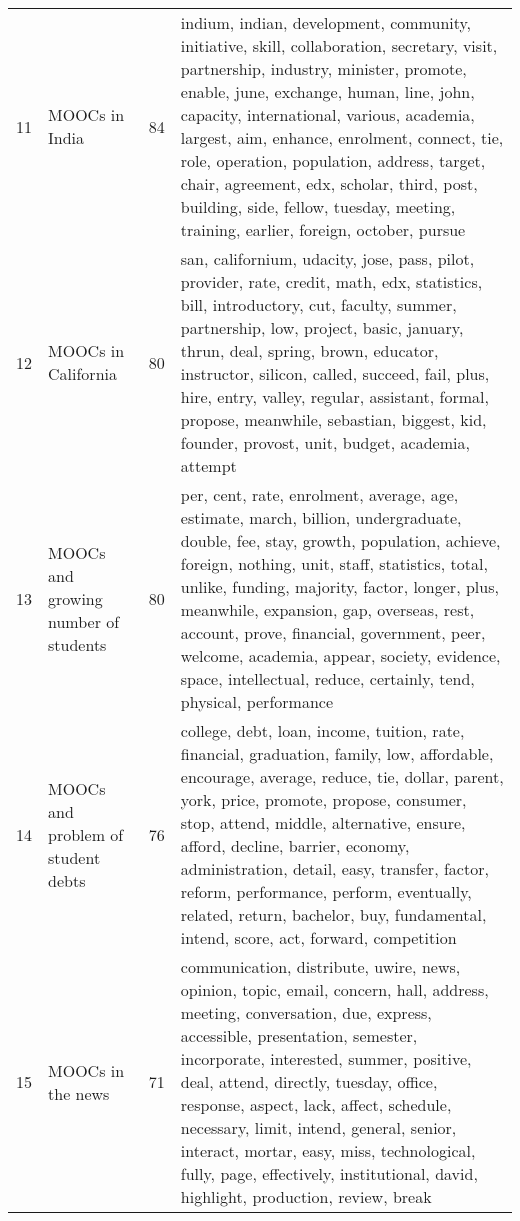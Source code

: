 \begin{table}[ht]
{\begin{tabularx}{\textwidth}{llrX}
   11 & MOOCs in India & 84 & indium, indian, development, community, initiative, skill, collaboration, secretary, visit, partnership, industry, minister, promote, enable, june, exchange, human, line, john, capacity, international, various, academia, largest, aim, enhance, enrolment, connect, tie, role, operation, population, address, target, chair, agreement, edx, scholar, third, post, building, side, fellow, tuesday, meeting, training, earlier, foreign, october, pursue \\ 
   12 & MOOCs in California & 80 & san, californium, udacity, jose, pass, pilot, provider, rate, credit, math, edx, statistics, bill, introductory, cut, faculty, summer, partnership, low, project, basic, january, thrun, deal, spring, brown, educator, instructor, silicon, called, succeed, fail, plus, hire, entry, valley, regular, assistant, formal, propose, meanwhile, sebastian, biggest, kid, founder, provost, unit, budget, academia, attempt \\ 
   13 & MOOCs and growing number of students & 80 & per, cent, rate, enrolment, average, age, estimate, march, billion, undergraduate, double, fee, stay, growth, population, achieve, foreign, nothing, unit, staff, statistics, total, unlike, funding, majority, factor, longer, plus, meanwhile, expansion, gap, overseas, rest, account, prove, financial, government, peer, welcome, academia, appear, society, evidence, space, intellectual, reduce, certainly, tend, physical, performance \\ 
   14 & MOOCs and problem of student debts & 76 & college, debt, loan, income, tuition, rate, financial, graduation, family, low, affordable, encourage, average, reduce, tie, dollar, parent, york, price, promote, propose, consumer, stop, attend, middle, alternative, ensure, afford, decline, barrier, economy, administration, detail, easy, transfer, factor, reform, performance, perform, eventually, related, return, bachelor, buy, fundamental, intend, score, act, forward, competition \\ 
   15 & MOOCs in the news & 71 & communication, distribute, uwire, news, opinion, topic, email, concern, hall, address, meeting, conversation, due, express, accessible, presentation, semester, incorporate, interested, summer, positive, deal, attend, directly, tuesday, office, response, aspect, lack, affect, schedule, necessary, limit, intend, general, senior, interact, mortar, easy, miss, technological, fully, page, effectively, institutional, david, highlight, production, review, break \\ 

\end{tabularx}}
\end{table}
